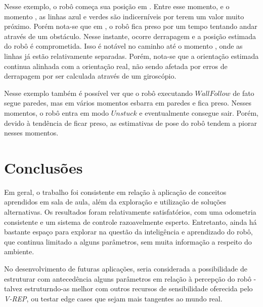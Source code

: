 \documentclass[twoside,conference,a4paper]{IEEEtran}
\newcommand*\circled[1]{\tikz[baseline=(char.base)]{
            \node[shape=circle,draw,inner sep=1pt] (char) {#1};}}
\begin{document}
Nesse exemplo, o robô começa sua posição em \circled{1}. Entre esse momento, e o momento \circled{2}, as linhas azul e verdes são indicerníveis por terem um valor muito próximo. Porém nota-se que em \circled{2}, o robô fica preso por um tempo tentando andar através de um obstáculo. Nesse instante, ocorre derrapagem e a posição estimada do robô é comprometida. Isso é notável no caminho até o momento \circled{3}, onde as linhas já estão relativamente separadas. Porém, nota-se que a orientação estimada continua alinhada com a orientação real, não sendo afetada por erros de derrapagem por ser calculada através de um giroscópio.

Nesse exemplo também é possível ver que o robô executando $Wall Follow$ de fato segue paredes, mas em vários momentos esbarra em paredes e fica preso. Nesses momentos, o robô entra em modo $Unstuck$ e eventualmente consegue sair. Porém, devido à tendência de ficar preso, as estimativas de pose do robô tendem a piorar nesses momentos.

\section{Conclusões}

Em geral, o trabalho foi consistente em relação à aplicação de conceitos aprendidos em sala de aula, além da exploração e utilização de soluções alternativas. Os resultados foram relativamente satisfatórios, com uma odometria consistente e um sistema de controle razoavelmente esperto. Entretanto, ainda há bastante espaço para explorar na questão da inteligência e aprendizado do robô, que continua limitado a alguns parâmetros, sem muita informação a respeito do ambiente. 

No desenvolvimento de futuras aplicações, seria considerada a possibilidade de estruturar com antecedência alguns parâmetros em relação à percepção do robô - talvez estruturndo-as melhor com outros recursos de sensibilidade oferecida pelo \textit{V-REP}, ou testar edge cases que sejam mais tangentes ao mundo real.






\end{document}

